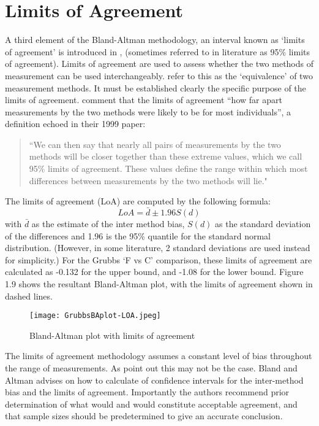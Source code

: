 \documentclass[12pt, a4paper]{article}
\begin{document}
\section{Limits of Agreement}
A third element of the Bland-Altman methodology, an interval known
as `limits of agreement' is introduced in \citet*{BA86},
(sometimes referred to in literature as 95\% limits of agreement).
Limits of agreement are used to assess whether the two methods of
measurement can be used interchangeably. \citet{BA86} refer to
this as the `equivalence' of two measurement methods. It must be
established clearly the specific purpose of the limits of
agreement. \citet*{BA95} comment that the limits of agreement
``how far apart measurements by the two methods were likely to be
for most individuals'', a definition echoed in their 1999 paper:

\begin{quote} ``We can then say that nearly all pairs
of measurements by the two methods will be closer together than
these extreme values, which we call 95\% limits of agreement.
These values define the range within which most differences
between measurements by the two methods will lie."
\end{quote}

The limits of agreement (LoA) are computed by the following
formula:
\begin{equation}
LoA = \bar{d} \pm 1.96 S(d)
\end{equation}
with $\bar{d}$ as the estimate of the inter method bias, $S(d)$ as
the standard deviation of the differences and 1.96 is the 95\%
quantile for the standard normal distribution. (However, in some
literature, 2 standard deviations are used instead for
simplicity.) For the Grubbs `F vs C' comparison, these limits of
agreement are calculated as -0.132 for the upper bound, and -1.08
for the lower bound. Figure 1.9 shows the resultant Bland-Altman
plot, with the limits of agreement shown in dashed lines.


\begin{figure}[h!]
\begin{center}
  \texttt{[image: GrubbsBAplot-LOA.jpeg]}
  \caption{Bland-Altman plot with limits of agreement}\label{GrubbsBAplot-noLOA}
\end{center}
\end{figure}

The limits of agreement methodology assumes a constant level of
bias throughout the range of measurements. As \citet*{BA86} point
out this may not be the case. Bland and Altman advises on how to
calculate of confidence intervals for the inter-method bias and
the limits of agreement. Importantly the authors recommend prior
determination of what would and would constitute acceptable
agreement, and that sample sizes should be predetermined to give
an accurate conclusion.
\end{document}
